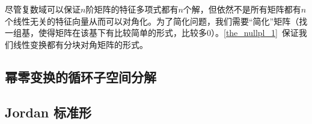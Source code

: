 

\begin{issues}
\issueDraft
\end{issues}
尽管复数域可以保证$n$阶矩阵的特征多项式都有$n$个解，但依然不是所有矩阵都有$n$个线性无关的特征向量从而可以对角化。为了简化问题，我们需要“简化”矩阵（找一组基，使得矩阵在该基下有比较简单的形式，比较多$0$）。\autoref{the_nullpl_1}~保证我们线性变换都有分块对角矩阵的形式。
\subsection{幂零变换的循环子空间分解}
\subsection{Jordan 标准形}